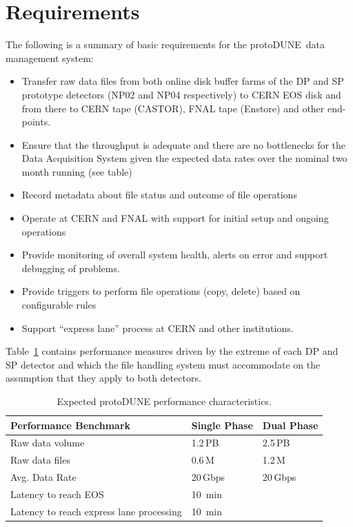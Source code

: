 \documentclass[pdftex,12pt,letter]{article}
\newcommand{\pd}{protoDUNE\ }
\begin{document}
\section{Requirements}

The following is a summary of basic requirements for the \pd data management system:
\begin{itemize}
\item Transfer raw data files from both online disk buffer farms of the DP and SP prototype detectors (NP02 and NP04 respectively) to CERN EOS disk and from there to CERN tape (CASTOR), FNAL tape (Enstore) and other end-points.
\item Ensure that the throughput is adequate and there are no bottlenecks for the Data Acquisition System given the expected data rates over the nominal two month running (see table)
\item Record metadata about file status and outcome of file operations
\item Operate at CERN and FNAL with support for initial setup and ongoing operations
\item Provide monitoring of overall system health, alerts on error and support debugging of problems.
\item Provide triggers to perform file operations (copy, delete) based on configurable rules
\item Support “express lane” process at CERN and other institutions.
\end{itemize}

\noindent
Table~\ref{fig:det_perf} contains performance measures driven by the extreme of each DP and SP detector and which the file handling system must accommodate on the assumption that they apply to both detectors.


\begin{table}[tbh]
\centering
\begin{tabular}{l l l}
\hline
\textbf{Performance Benchmark} & \textbf{Single Phase} & \textbf{Dual Phase}\\
\hline
\hline
Raw data volume                          & 1.2\,PB & 2.5\,PB \\
Raw data files                          & 0.6\,M  & 1.2\,M\\
Avg. Data Rate                                & 20\,Gbps & 20\,Gbps \\
Latency to reach EOS                     & 10~min & \\
Latency to reach express lane processing & 10~min &\\
\hline
\end{tabular}
\caption{\label{fig:det_perf}Expected protoDUNE performance characteristics.}
\end{table}
\end{document}

